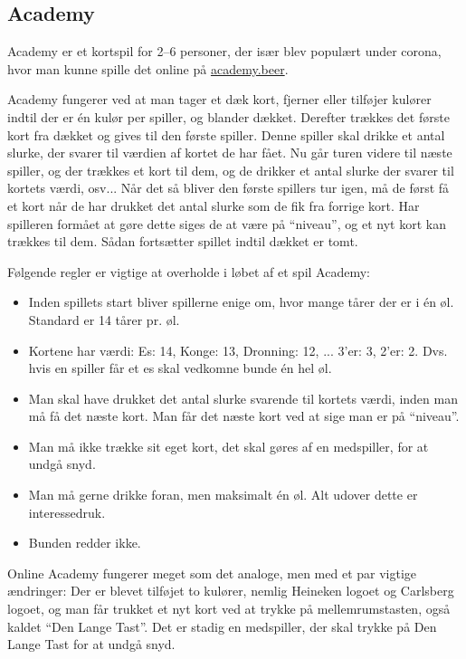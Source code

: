 \subsection{Academy}

Academy er et kortspil for 2--6 personer, der især blev populært under corona, hvor man kunne spille det online på \href{https://academy.beer/}{academy.beer}.

Academy fungerer ved at man tager et dæk kort, fjerner eller tilføjer kulører indtil der er én kulør per spiller, og blander dækket. Derefter trækkes det første kort fra dækket og gives til den første spiller. Denne spiller skal drikke et antal slurke, der svarer til værdien af kortet de har fået. Nu går turen videre til næste spiller, og der trækkes et kort til dem, og de drikker et antal slurke der svarer til kortets værdi, osv... Når det så bliver den første spillers tur igen, må de først få et kort når de har drukket det antal slurke som de fik fra forrige kort. Har spilleren formået at gøre dette siges de at være på ``niveau'', og et nyt kort kan trækkes til dem. Sådan fortsætter spillet indtil dækket er tomt.

Følgende regler er vigtige at overholde i løbet af et spil Academy:
\begin{itemize}
	\item Inden spillets start bliver spillerne enige om, hvor mange tårer der er i én øl. Standard er 14 tårer pr. øl.
	\item Kortene har værdi: Es: 14, Konge: 13, Dronning: 12, ... 3'er: 3, 2'er: 2. Dvs. hvis en spiller får et es skal vedkomne bunde én hel øl.
	\item Man skal have drukket det antal slurke svarende til kortets værdi, inden man må få det næste kort. Man får det næste kort ved at sige man er på ``niveau''.
	\item Man må ikke trække sit eget kort, det skal gøres af en medspiller, for at undgå snyd.
	\item Man må gerne drikke foran, men maksimalt én øl. Alt udover dette er interessedruk.
	\item Bunden redder ikke.
\end{itemize}

Online Academy fungerer meget som det analoge, men med et par vigtige ændringer: Der er blevet tilføjet to kulører, nemlig Heineken logoet og Carlsberg logoet, og man får trukket et nyt kort ved at trykke på mellemrumstasten, også kaldet ``Den Lange Tast''. Det er stadig en medspiller, der skal trykke på Den Lange Tast for at undgå snyd.

